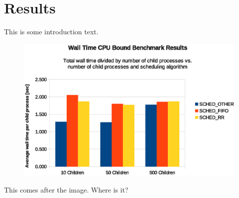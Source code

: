 \section{Results}

This is some introduction text.

\begin{figure}[H]
  \begin{center}
    \includegraphics[scale=1.0]{img/cpu-wall-child.eps}
    \caption{}
    \label{cpu-wall-child}
  \end{center}
\end{figure}

This comes after the image. Where is it?
